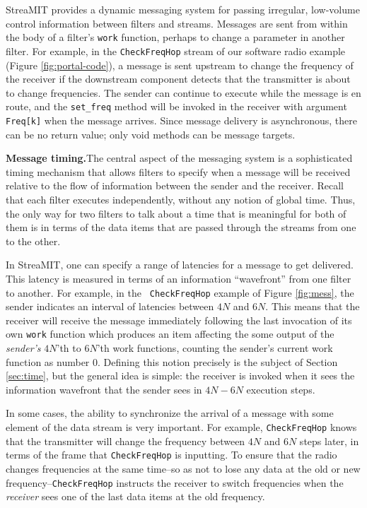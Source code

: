 StreaMIT provides a dynamic messaging system for passing irregular,
low-volume control information between filters and streams.  Messages
are sent from within the body of a filter's {\tt work} function,
perhaps to change a parameter in another filter.  For example, in the
{\tt CheckFreqHop} stream of our software radio example (Figure
\ref{fig:portal-code}), a message is sent upstream to change the frequency of
the receiver if the downstream component detects that the transmitter
is about to change frequencies.  The sender can continue to execute
while the message is en route, and the {\tt set\_freq} method will be
invoked in the receiver with argument {\tt Freq[k]} when the message
arrives.  Since message delivery is asynchronous, there can be no
return value; only void methods can be message targets.

{\bf Message timing.}The central aspect of the messaging system is a
sophisticated timing mechanism that allows filters to specify when a
message will be received relative to the flow of information between
the sender and the receiver.  Recall that each filter executes
independently, without any notion of global time.  Thus, the only way
for two filters to talk about a time that is meaningful for both of
them is in terms of the data items that are passed through the streams
from one to the other.

In StreaMIT, one can specify a range of latencies for a message to get
delivered.  This latency is measured in terms of an information
``wavefront'' from one filter to another.  For example, in the {\tt
CheckFreqHop} example of Figure \ref{fig:mess}, the sender indicates
an interval of latencies between $4N$ and $6N$.  This means that the
receiver will receive the message immediately following the last
invocation of its own {\tt work} function which produces an item
affecting the some output of the {\it sender's} $4N$'th to $6N$'th
work functions, counting the sender's current work function as number
0.  Defining this notion precisely is the subject of Section
\ref{sec:time}, but the general idea is simple:  the receiver is
invoked when it sees the information wavefront that the sender sees in
$4N-6N$ execution steps.  

In some cases, the ability to synchronize the arrival of a message
with some element of the data stream is very important.  For example,
{\tt CheckFreqHop} knows that the transmitter will change the
frequency between $4N$ and $6N$ steps later, in terms of the frame
that {\tt CheckFreqHop} is inputting.  To ensure that the radio
changes frequencies at the same time--so as not to lose any data at
the old or new frequency--{\tt CheckFreqHop} instructs the receiver to
switch frequencies when the {\it receiver} sees one of the last data
items at the old frequency.

